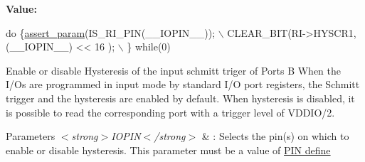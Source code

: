 {\bfseries Value\-:}
\begin{DoxyCode}
\textcolor{keywordflow}{do} \{\hyperlink{stm32l1xx__hal__conf_8h_a631dea7b230e600555f979c62af1de21}{assert\_param}(IS\_RI\_PIN(\_\_IOPIN\_\_)); \(\backslash\)
            CLEAR\_BIT(RI->HYSCR1, (\_\_IOPIN\_\_) << 16 ); \(\backslash\)
          \} \textcolor{keywordflow}{while}(0)
\end{DoxyCode}


Enable or disable Hysteresis of the input schmitt triger of Ports B When the I/\-Os are programmed in input mode by standard I/\-O port registers, the Schmitt trigger and the hysteresis are enabled by default. When hysteresis is disabled, it is possible to read the corresponding port with a trigger level of V\-D\-D\-I\-O/2. 


\begin{DoxyParams}{Parameters}
{\em $<$strong$>$\-I\-O\-P\-I\-N$<$/strong$>$} & \-: Selects the pin(s) on which to enable or disable hysteresis. This parameter must be a value of \hyperlink{group___r_i___pin}{P\-I\-N define} \\
\hline
\end{DoxyParams}

